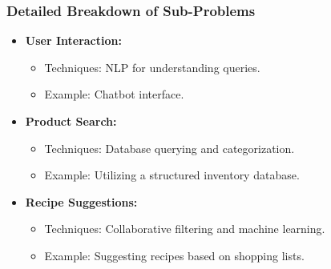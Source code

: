 \documentclass[aspectratio=169]{beamer}
\begin{document}
\begin{frame}[fragile]
    \frametitle{Detailed Breakdown of Sub-Problems}
    \begin{itemize}
        \item \textbf{User Interaction:}
        \begin{itemize}
            \item Techniques: NLP for understanding queries.
            \item Example: Chatbot interface.
        \end{itemize}
        
        \item \textbf{Product Search:}
        \begin{itemize}
            \item Techniques: Database querying and categorization.
            \item Example: Utilizing a structured inventory database.
        \end{itemize}
        
        \item \textbf{Recipe Suggestions:}
        \begin{itemize}
            \item Techniques: Collaborative filtering and machine learning.
            \item Example: Suggesting recipes based on shopping lists.
        \end{itemize}
    \end{itemize}
\end{frame}
\end{document}
